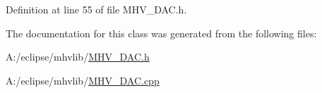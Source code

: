 \-Definition at line 55 of file \-M\-H\-V\-\_\-\-D\-A\-C.\-h.



\-The documentation for this class was generated from the following files\-:\begin{DoxyCompactItemize}
\item 
\-A\-:/eclipse/mhvlib/\hyperlink{_m_h_v___d_a_c_8h}{\-M\-H\-V\-\_\-\-D\-A\-C.\-h}\item 
\-A\-:/eclipse/mhvlib/\hyperlink{_m_h_v___d_a_c_8cpp}{\-M\-H\-V\-\_\-\-D\-A\-C.\-cpp}\end{DoxyCompactItemize}
